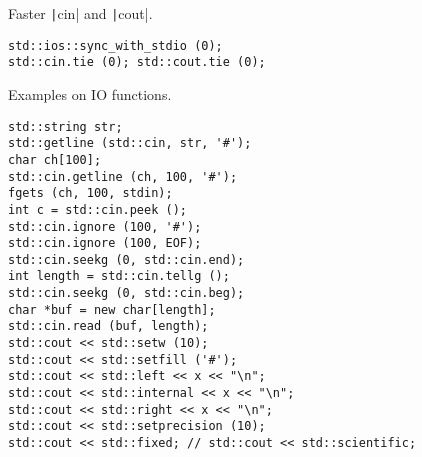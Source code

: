 Faster \texttt|cin| and \texttt|cout|.

\begin{verbatim}
std::ios::sync_with_stdio (0);
std::cin.tie (0); std::cout.tie (0);
\end{verbatim}

Examples on IO functions.

\begin{verbatim}
std::string str;
std::getline (std::cin, str, '#');
char ch[100];
std::cin.getline (ch, 100, '#');
fgets (ch, 100, stdin);
int c = std::cin.peek ();
std::cin.ignore (100, '#');
std::cin.ignore (100, EOF);
std::cin.seekg (0, std::cin.end);
int length = std::cin.tellg ();
std::cin.seekg (0, std::cin.beg);
char *buf = new char[length];
std::cin.read (buf, length);
std::cout << std::setw (10);
std::cout << std::setfill ('#');
std::cout << std::left << x << "\n";
std::cout << std::internal << x << "\n";
std::cout << std::right << x << "\n";
std::cout << std::setprecision (10);
std::cout << std::fixed; // std::cout << std::scientific;
\end{verbatim}

